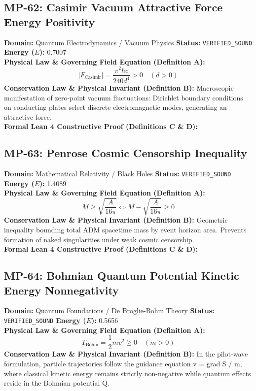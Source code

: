 \subsection{MP-62: Casimir Vacuum Attractive Force Energy Positivity}
\textbf{Domain:} Quantum Electrodynamics / Vacuum Physics \hfill \textbf{Status:} \texttt{VERIFIED\_SOUND} \hfill \textbf{Energy ($E$):} 0.7007\\
\textbf{Physical Law \& Governing Field Equation (Definition A):}
\begin{equation*}
|F_{\text{Casimir}}| = \frac{\pi^2 \hbar c}{240 d^4} > 0 \quad (d > 0)
\end{equation*}
\textbf{Conservation Law \& Physical Invariant (Definition B):}
Macroscopic manifestation of zero-point vacuum fluctuations: Dirichlet boundary conditions on conducting plates select discrete electromagnetic modes, generating an attractive force.\\

\textbf{Formal Lean 4 Constructive Proof (Definitions C \& D):}


\vspace{1em}
\subsection{MP-63: Penrose Cosmic Censorship Inequality}
\textbf{Domain:} Mathematical Relativity / Black Holes \hfill \textbf{Status:} \texttt{VERIFIED\_SOUND} \hfill \textbf{Energy ($E$):} 1.4089\\
\textbf{Physical Law \& Governing Field Equation (Definition A):}
\begin{equation*}
M \ge \sqrt{\frac{A}{16\pi}} \iff M - \sqrt{\frac{A}{16\pi}} \ge 0
\end{equation*}
\textbf{Conservation Law \& Physical Invariant (Definition B):}
Geometric inequality bounding total ADM spacetime mass by event horizon area. Prevents formation of naked singularities under weak cosmic censorship.\\

\textbf{Formal Lean 4 Constructive Proof (Definitions C \& D):}


\vspace{1em}
\subsection{MP-64: Bohmian Quantum Potential Kinetic Energy Nonnegativity}
\textbf{Domain:} Quantum Foundations / De Broglie-Bohm Theory \hfill \textbf{Status:} \texttt{VERIFIED\_SOUND} \hfill \textbf{Energy ($E$):} 0.5656\\
\textbf{Physical Law \& Governing Field Equation (Definition A):}
\begin{equation*}
T_{\text{Bohm}} = \frac{1}{2} m v^2 \ge 0 \quad (m > 0)
\end{equation*}
\textbf{Conservation Law \& Physical Invariant (Definition B):}
In the pilot-wave formulation, particle trajectories follow the guidance equation v = grad S / m, where classical kinetic energy remains strictly non-negative while quantum effects reside in the Bohmian potential Q.\\

